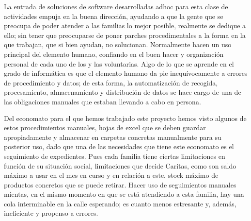 \vspace{1em}
\par La entrada de soluciones de software desarrolladas adhoc para esta clase de actividades empuja en la buena dirección, ayudando a que la gente que se preocupa de poder atender a las familias lo mejor posible, realmente se dedique a ello; sin tener que preocuparse de poner parches procedimentales a la forma en la que trabajan, que si bien ayudan, no solucionan. Normalmente hacen un uso principal del elemento humano, confiando en el buen hacer y organización personal de cada uno de los y las voluntarias. Algo de lo que se aprende en el grado de informática es que el elemento humano da pie inequívocamente a errores de procedimiento y datos; de esta forma, la automatización de recogida, procesamiento, almacenamiento y distribución de datos se hace cargo de una de las obligaciones manuales que estaban llevando a cabo en persona.
\vspace{1em}
\par Del economato para el que hemos trabajado este proyecto hemos visto algunos de estos procedimientos manuales, hojas de excel que se deben guardar apropiadamente y almacenar en carpetas concretas manualmente para su posterior uso, dado que una de las necesidades que tiene este economato es el seguimiento de expedientes. Pues cada familia tiene ciertas limitaciones en función de su situación social, limitaciones que decide Caritas, como son saldo máximo a usar en el mes en curso y en relación a este, stock máximo de productos concretos que se puede retirar. Hacer uso de seguimientos manuales mientas, en el mismo momento en que se está atendiendo a esta familia, hay una cola interminable en la calle esperando; es cuanto menos estresante y, además, ineficiente y propenso a errores.
\vspace{1em}
 
